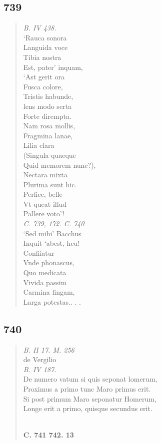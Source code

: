 \documentclass[11pt, a4paper]{report}
\begin{document}
            \subsection*{739}
      \begin{verse}
      \textit{B. IV 438.} \\ ‘Rauca sonora \\ Languida voce \\ Tibia nostra \\ Est, pater’ inquam, \\ ‘Ast gerit ora \\ Fusca colore, \\ Tristis habunde, \\ lens modo serta \\ Forte dirempta. \\ Nam rosa mollis, \\ Fragmina lanae, \\ Lilia clara \\ (Singula quaeque \\ Quid memorem nunc?), \\ Nectara mixta \\ Plurima sunt hic. \\ Perfice, belle \\ Vt queat illud \\ Pallere voto’! \\ 
        ﻿\pagebreak 
    \textit{C. 739, 172. C. 740} \\ ‘Sed mibi’ Bacchus \\ Inquit ‘abest, heu! \\ Confiiatur \\ Vnde phonascus, \\ Quo medicata \\ Vivida passim \\ Carmina fingam, \\ Larga potestas.. . . \\ 
      \end{verse}
  
            \subsection*{740}
      \begin{verse}
      \textit{B. II 17. M. 256} \\ de Vergilio \\ \textit{B. IV 187.} \\ De numero vatum si quis seponat lomerum, \\ Proximus a primo tunc Maro primus erit. \\ Si post primum Maro seponatur Homerum, \\ Longe erit a primo, quisque secundus erit. \\ 
        ﻿\pagebreak 
    \begin{center} \textbf{C. 741 742. 13} \end{center} \marginpar{[225]} 
      \end{verse}
  
\end{document}
